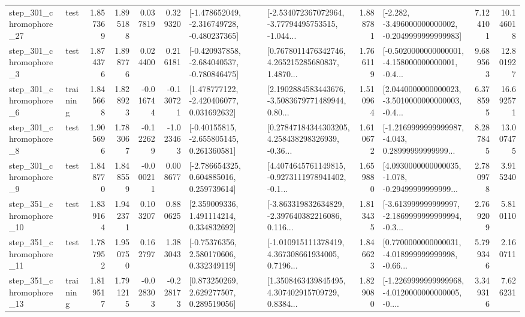 \begin{tabular}{llrrrrllrlrr}
  step\_301\_chromophore\_27 &      test &      1.857369 &    1.895188 &      0.037819 &  0.329320 &  [-1.478652049, -2.316749728, -0.480237365] &  [-2.534072367072964, -3.77794495753515, -1.044... &       1.888781 &  [-2.282, -3.496000000000002, -0.2049999999999983] &            7.124101 &         10.146018 \\
   step\_301\_chromophore\_3 &      test &      1.874376 &    1.898776 &      0.024400 &  0.216181 &  [-0.420937858, -2.684040537, -0.780846475] &  [0.7678011476342746, 4.265215285680837, 1.4870... &       1.766119 &  [-0.5020000000000001, -4.158000000000001, -0.4... &            9.689563 &         12.801927 \\
   step\_301\_chromophore\_6 &  training &      1.845668 &    1.828923 &     -0.016744 & -0.130721 &    [1.478777122, -2.420406077, 0.031692632] &  [2.1902884583443676, -3.5083679771489944, 0.80... &       1.510964 &  [2.0440000000000023, -3.5010000000000003, -0.4... &            6.378595 &         16.692571 \\
   step\_301\_chromophore\_8 &      test &      1.905696 &    1.783067 &     -0.122629 & -1.023463 &    [-0.40155815, -2.655805145, 0.261360581] &  [0.27847184344303205, 4.258438298326939, -0.36... &       1.610672 &  [-1.2169999999999987, -4.043, 0.28999999999999... &            8.287845 &         13.007475 \\
   step\_301\_chromophore\_9 &      test &      1.848770 &    1.848559 &     -0.000211 &  0.008677 &    [-2.786654325, 0.604885016, 0.259739614] &  [4.4074645761149815, -0.9273111978941402, -0.1... &       1.659880 &  [4.0930000000000035, -1.078, -0.29499999999999... &            2.780978 &          3.915240 \\
  step\_351\_chromophore\_10 &      test &      1.839164 &    1.942371 &      0.103207 &  0.880625 &     [2.359009336, 1.491114214, 0.334832692] &  [-3.863319832634829, -2.397640382216086, 0.116... &       1.813435 &  [-3.613999999999997, -2.1869999999999994, -0.3... &            2.769209 &          5.810110 \\
  step\_351\_chromophore\_11 &      test &      1.787952 &    1.950750 &      0.162797 &  1.383043 &     [-0.75376356, 2.580170606, 0.332349119] &  [-1.010915111378419, 4.367308661934005, 0.7196... &       1.846623 &  [0.7700000000000031, -4.018999999999998, -0.66... &            5.799346 &          2.160711 \\
  step\_351\_chromophore\_13 &  training &      1.819517 &    1.791215 &     -0.028303 & -0.228173 &     [0.873250269, 2.629277507, 0.289519056] &  [1.3508463439845495, 4.307402915709729, 0.8384... &       1.829080 &  [-1.2269999999999968, -4.0120000000000005, -0.... &            3.349316 &          7.626231 \\

\end{tabular}
